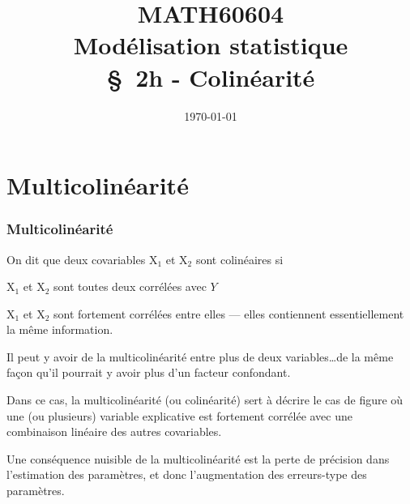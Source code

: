 \documentclass[xcolor={dvipsnames}]{beamer}
\title[\color{white}{MATH60604 \S~2h - Colinéarité}]{MATH60604 \\Modélisation statistique \\ \S~2h - Colinéarité}
\author{}
\date{\today}
\institute{HEC Montréal\\
Département de sciences de la décision}
\date{}
\begin{document}
\frame{\titlepage}
\section{Multicolinéarité}

\begin{frame}
\frametitle{Multicolinéarité}
\bi
\item On dit que deux covariables $\mathrm{X}_1$ et $\mathrm{X}_2$ sont \alert{colinéaires} si
\bi
\item $\mathrm{X}_1$ et $\mathrm{X}_2$ sont toutes deux corrélées avec $Y$
\item $\mathrm{X}_1$ et $\mathrm{X}_2$ sont fortement corrélées entre elles --- elles contiennent essentiellement la même information.
\ei
\item Il peut y avoir de la multicolinéarité entre plus de deux variables\ldots de la même façon qu'il pourrait y avoir plus d'un facteur confondant.
\item Dans ce cas, la \alert{multicolinéarité} (ou  colinéarité) sert à décrire le cas de figure où une (ou plusieurs) variable explicative est fortement corrélée avec une combinaison linéaire des autres covariables.
\item Une conséquence nuisible de la multicolinéarité est la \alert{perte de précision} dans l'estimation des paramètres, et donc l'augmentation des erreurs-type des paramètres. 
\ei
\end{frame}
\end{document}
